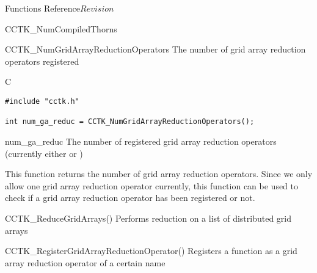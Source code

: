 \begin{cactuspart}{ Functions Reference}{}{$Revision$}
\begin{FunctionDescription}{CCTK\_NumCompiledThorns}

\end{FunctionDescription}


\begin{FunctionDescription}{CCTK\_NumGridArrayReductionOperators}
\label{CCTK-NumGridArrayReductionOperators}
The number of grid array reduction operators registered

\begin{SynopsisSection}
\begin{Synopsis}{C}
\begin{verbatim}
#include "cctk.h"

int num_ga_reduc = CCTK_NumGridArrayReductionOperators();
\end{verbatim}
\end{Synopsis}
\end{SynopsisSection}

\begin{ResultSection}
\begin{Result}{num\_ga\_reduc}
The number of registered grid array reduction operators (currently either 
 or )
\end{Result}
\end{ResultSection}


\begin{Discussion}
This function returns the number of grid array reduction operators. Since we only allow one grid array reduction operator currently, this function can be used to check if a
grid array reduction operator has been registered or not.
\end{Discussion}

\begin{SeeAlsoSection}
\begin{SeeAlso}{CCTK\_ReduceGridArrays()}
Performs reduction on a list of distributed grid arrays
\end{SeeAlso}

\begin{SeeAlso}{CCTK\_RegisterGridArrayReductionOperator()}
Registers a function as a grid array reduction operator of a certain name
\end{SeeAlso}


\end{SeeAlsoSection}
\end{FunctionDescription}
\end{cactuspart}
